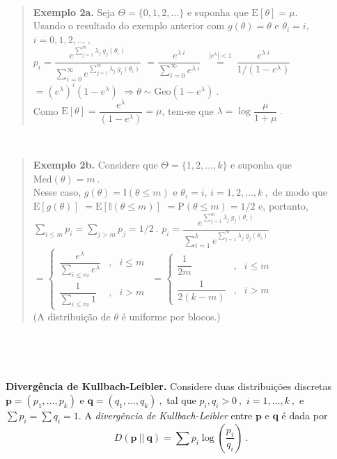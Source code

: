 \documentclass[
]{book}
\begin{document}
\(~\)

\begin{quote}
\textbf{Exemplo 2a.} Seja \(\Theta = \{0,1,2,\ldots\}\) e suponha que \(\text{E}[\theta]=\mu.\)\\
Usando o resultado do exemplo anterior com \(g(\theta)=\theta\) e \(\theta_i=i\), \(i=0,1,2,\ldots~,\)\\
\(p_i=\dfrac{e^{\sum_{j=1}^m \lambda_j~g_j(\theta_i)}}{\sum_{i=0}^\infty e^{\sum_{j=1}^m \lambda_j~g_j(\theta_i)}}\)
\(=\dfrac{e^{\lambda~i}}{\sum_{i=0}^\infty e^{\lambda~i}}~\)
\(\overset{\left|e^\lambda\right|<1}{=}~\dfrac{e^{\lambda~i}}{1/\left(1-e^\lambda\right)}\)
\(=\left(e^\lambda\right)^i\left(1-e^\lambda\right)\)
\(\Longrightarrow \theta \sim \text{Geo}\left(1-e^\lambda\right)~.\)\\
Como \(\text{E}\left[\theta\right]=\dfrac{e^\lambda}{\left(1-e^\lambda\right)}=\mu\), tem-se que \(\lambda=\log\dfrac{\mu}{1+\mu}~.\)
\end{quote}

\(~\)

\begin{quote}
\textbf{Exemplo 2b.} Considere que \(\Theta = \{1,2,\ldots,k\}\) e suponha que \(\text{Med}(\theta)=m~.\)\\
Nesse caso, \(g(\theta)=\mathbb{I}\left(\theta\leq m\right)\) e \(\theta_i=i\), \(i=1,2,\ldots,k~,\) de modo que\\
\(\text{E}\left[g(\theta)\right]\) \(=\text{E}\left[\mathbb{I}(\theta\leq m)\right]\) \(=\text{P}\left(\theta\leq m\right)=1/2\) e, portanto, \(\displaystyle\sum_{i\leq m}p_i=\sum_{j> m}p_j=1/2~.\)
\(p_i=\dfrac{e^{\sum_{j=1}^m \lambda_j~g_j(\theta_i)}}{\sum_{i=1}^k e^{\sum_{j=1}^m \lambda_j~g_j(\theta_i)}}\)
\(=\left\{\begin{array}{lll} \dfrac{e^\lambda}{\sum_{i\leq m} e^\lambda}&,& i\leq m \\ \dfrac{1}{\sum_{i\leq m} 1}&,& i> m\end{array}\right.\)
\(=\left\{\begin{array}{lll} \dfrac{1}{2m}&,& i\leq m \\ \dfrac{1}{2(k-m)}&,& i> m\end{array}\right.\)\\
(A distribuição de \(\theta\) é uniforme por blocos.)
\end{quote}

\(~\)

\(~\)

\textbf{Divergência de Kullbach-Leibler.} Considere duas distribuições discretas \(\boldsymbol{p} = (p_1,\ldots,p_k)\) e \(\boldsymbol{q} = (q_1,\ldots,q_k)~,\) tal que \(p_i,q_i>0~,\) \(i=1,\ldots,k~,\) e \(\sum p_i=\sum q_i=1\). A \emph{divergência de Kullbach-Leibler} entre \(\boldsymbol{p}\) e \(\boldsymbol{q}\) \citep{Kullback51} é dada por\\
\[D(\boldsymbol{p}~||~\boldsymbol{q})=\sum p_i\log\left(\dfrac{p_i}{q_i}\right)~.\]
\end{document}
